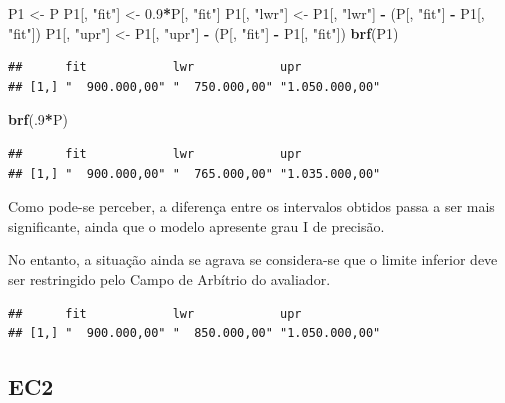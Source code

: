 \documentclass{article}
\newenvironment{Shaded}{\begin{snugshade}}{\end{snugshade}}
\newcommand{\DecValTok}[1]{\textcolor[rgb]{0.00,0.00,0.81}{#1}}
\newcommand{\FloatTok}[1]{\textcolor[rgb]{0.00,0.00,0.81}{#1}}
\newcommand{\KeywordTok}[1]{\textcolor[rgb]{0.13,0.29,0.53}{\textbf{#1}}}
\newcommand{\NormalTok}[1]{#1}
\newcommand{\OperatorTok}[1]{\textcolor[rgb]{0.81,0.36,0.00}{\textbf{#1}}}
\newcommand{\StringTok}[1]{\textcolor[rgb]{0.31,0.60,0.02}{#1}}
\begin{document}
\begin{Shaded}
\begin{Highlighting}[]
\NormalTok{P1 <-}\StringTok{ }\NormalTok{P}
\NormalTok{P1[, }\StringTok{"fit"}\NormalTok{] <-}\StringTok{ }\FloatTok{0.9}\OperatorTok{*}\NormalTok{P[, }\StringTok{"fit"}\NormalTok{]}
\NormalTok{P1[, }\StringTok{"lwr"}\NormalTok{] <-}\StringTok{ }\NormalTok{P1[, }\StringTok{"lwr"}\NormalTok{] }\OperatorTok{-}\StringTok{ }\NormalTok{(P[, }\StringTok{"fit"}\NormalTok{] }\OperatorTok{-}\StringTok{ }\NormalTok{P1[, }\StringTok{"fit"}\NormalTok{])}
\NormalTok{P1[, }\StringTok{"upr"}\NormalTok{] <-}\StringTok{ }\NormalTok{P1[, }\StringTok{"upr"}\NormalTok{] }\OperatorTok{-}\StringTok{ }\NormalTok{(P[, }\StringTok{"fit"}\NormalTok{] }\OperatorTok{-}\StringTok{ }\NormalTok{P1[, }\StringTok{"fit"}\NormalTok{])}
\KeywordTok{brf}\NormalTok{(P1)}
\end{Highlighting}
\end{Shaded}

\begin{verbatim}
##      fit            lwr            upr           
## [1,] "  900.000,00" "  750.000,00" "1.050.000,00"
\end{verbatim}

\begin{Shaded}
\begin{Highlighting}[]
\KeywordTok{brf}\NormalTok{(.}\DecValTok{9}\OperatorTok{*}\NormalTok{P)}
\end{Highlighting}
\end{Shaded}

\begin{verbatim}
##      fit            lwr            upr           
## [1,] "  900.000,00" "  765.000,00" "1.035.000,00"
\end{verbatim}

Como pode-se perceber, a diferença entre os intervalos obtidos passa a
ser mais significante, ainda que o modelo apresente grau I de precisão.

No entanto, a situação ainda se agrava se considera-se que o limite
inferior deve ser restringido pelo Campo de Arbítrio do avaliador.

\begin{verbatim}
##      fit            lwr            upr           
## [1,] "  900.000,00" "  850.000,00" "1.050.000,00"
\end{verbatim}

\hypertarget{ec2}{%
\subsection{EC2}\label{ec2}}
\end{document}
